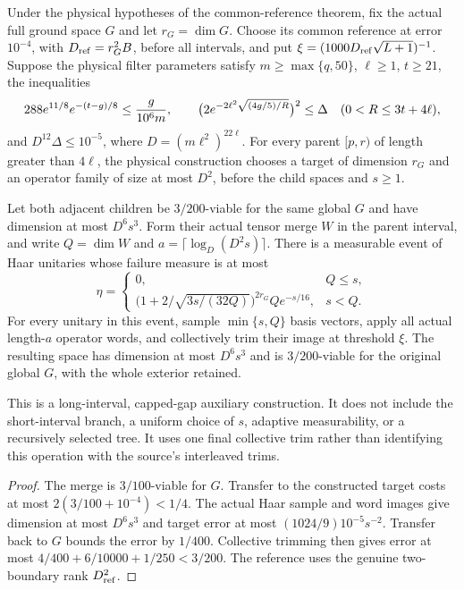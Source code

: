 \begin{lemma}
    \label{thm:physical_dg_sampled_node}
    \leanok
    Under the physical hypotheses of the common-reference theorem,
    fix the actual full ground space $G$ and let $r_G=\dim G$.
    Choose its common reference at error $10^{-4}$, with
    $D_{\rm ref}=r_G^2B$, before all intervals, and put
    $\xi=(1000D_{\rm ref}\sqrt{L+1})^{-1}$.
    Suppose the physical filter parameters satisfy $m\ge\max\{q,50\}$,
    $\ell\ge1$, $t\ge21$, the inequalities
    \[
        288e^{11/8}e^{-(t-g)/8}\le {g\over10^6m},\qquad
        \bigl(2e^{-2\ell^2\sqrt{(4g/5)/R}}\bigr)^2\le\Delta
        \quad(0<R\le3t+4\ell),
    \]
    and $D^{12}\Delta\le10^{-5}$, where
    $D=(m\ell^2)^{22\ell}$.
    For every parent $[p,r)$ of length greater than $4\ell$, the physical
    construction chooses a target of dimension $r_G$ and an operator
    family of size at most $D^2$, before the child spaces and $s\ge1$.

    Let both adjacent children be $3/200$-viable for the same global $G$
    and have dimension at most $D^6s^3$. Form their actual tensor merge
    $W$ in the parent interval, and write $Q=\dim W$ and
    $a=\lceil\log_D(D^2s)\rceil$.
    There is a measurable event of Haar unitaries whose failure measure
    is at most
    \[
        \eta=\begin{cases}
            0,                                                & Q\le s, \\
            \bigl(1+2/\sqrt{3s/(32Q)}\bigr)^{2r_G}Qe^{-s/16}, & s<Q.
        \end{cases}
    \]
    For every unitary in this event, sample $\min\{s,Q\}$ basis vectors,
    apply all actual length-$a$ operator words, and collectively trim
    their image at threshold $\xi$. The resulting space has dimension
    at most $D^6s^3$ and is $3/200$-viable for the original global $G$,
    with the whole exterior retained.

    This is a long-interval, capped-gap auxiliary construction. It does
    not include the short-interval branch, a uniform choice of $s$,
    adaptive measurability, or a recursively selected tree. It uses one
    final collective trim rather than identifying this operation with
    the source's interleaved trims.
\end{lemma}
\begin{proof}\leanok
    The merge is $3/100$-viable for $G$. Transfer to the constructed
    target costs at most $2(3/100+10^{-4})<1/4$.
    The actual Haar sample and word images give dimension at most
    $D^6s^3$ and target error at most
    $(1024/9)10^{-5}s^{-2}$. Transfer back to $G$ bounds the error by
    $1/400$. Collective trimming then gives error at most
    $4/400+6/10000+1/250<3/200$.
    The reference uses the genuine two-boundary rank $D_{\rm ref}^2$.
\end{proof}


